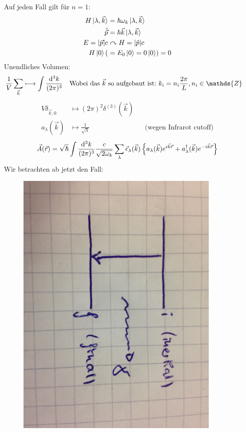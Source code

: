 		Auf jeden Fall gilt für $n=1$:
		\begin{align*}
		H \ket{\lambda, \vec{k}} &= \hbar \omega_k \ket{\lambda , \vec{k}} \\
		\hat{\vec{p}} &= \hbar \vec{k} \ket{\lambda , \vec{k}} \\
		E = |\vec{p}| c &\curvearrowright H = |\hat{p}| c \\
		H \ket{0} (&= E_0 \ket{0} = 0 \ket{0} ) = 0
		\end{align*}
		Unendliches Volumen: 
		\begin{align*}
		\frac{1}{V} \sum_{\vec{k}} &\longmapsto \int \frac{\diff^3 k}{(2 \pi)^3}
		& \text{Wobei das~} \vec{k} \text{~so aufgebaut ist:~}k_i &= n_i \frac{2 \pi}{L}, n_i \in \mathds{Z}
		\end{align*} 
		\begin{align*}
		V \delta_{\vec{k} , 0} &\longmapsto (2 \pi)^2 \delta^{(3)} (\vec{k}) \\
		a_\lambda (\vec{k}) &\longmapsto \frac{1}{\sqrt{\lambda}} 
		& &\text{(wegen Infrarot cutoff)}
		\end{align*} 
		\begin{align*}
		\vec{A} (\vec{r}) =
		\sqrt{\hbar} \int \frac{\mathrm{d}^3 k}{(2 \pi)^3} \frac{c}{\sqrt{2 \omega_k}}
		\sum_\lambda \vec{\epsilon}_\lambda (\vec{k})
		\left\{ a_\lambda (\vec{k}) e^{i \vec{k} \vec{r}}
		+ a^\dagger_\lambda (\vec{k}) e^{-i \vec{k} \vec{r}}
		\right\}
		\end{align*}
		Wir betrachten ab jetzt den Fall: 
		\begin{figure} [ht]
			\begin{center}
				\includegraphics[width=10cm]{Bild2.jpg}
			\end{center}
		\end{figure}
